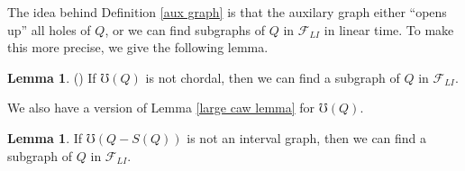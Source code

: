 \documentclass{article}
\theoremstyle{definition}
\newtheorem{lemma}[thm]{Lemma}
\begin{document}
    The idea behind Definition \ref{aux graph}
    is that the auxilary graph either
    ``opens up'' all holes of $Q$,
    or we can find subgraphs of $Q$ in
    $\mathcal{F}_{LI}$ in linear time. 
    To make this more precise, we 
    give the following lemma.

    \begin{lemma} (\cite{main}) 
        If $\mho\left(Q\right)$ is not chordal,
        then we can find a subgraph of
        $Q$ in $\mathcal{F}_{LI}$.
    \end{lemma}
   
    We also have a version of
    Lemma \ref{large caw lemma}
    for $\mho\left(Q\right)$.

    \begin{lemma}
        If $\mho\left(Q - S\left(Q\right)\right)$
        is not an interval graph,
        then we can
        find a subgraph of 
        $Q$ in $\mathcal{F}_{LI}$.
    \end{lemma}
\end{document}
